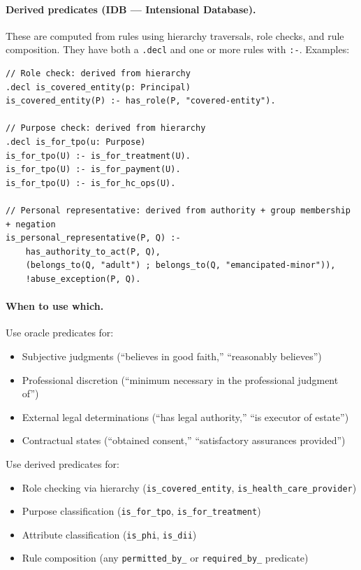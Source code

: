 \documentclass[11pt,letterpaper]{article}
\begin{document}
\paragraph{Derived predicates (IDB --- Intensional Database).} These are computed from rules using hierarchy traversals, role checks, and rule composition. They have both a \texttt{.decl} and one or more rules with \texttt{:-}. Examples:

\begin{lstlisting}[style=soufflestyle,caption={Derived predicates (from hipaa\_macros.dl)}]
// Role check: derived from hierarchy
.decl is_covered_entity(p: Principal)
is_covered_entity(P) :- has_role(P, "covered-entity").

// Purpose check: derived from hierarchy
.decl is_for_tpo(u: Purpose)
is_for_tpo(U) :- is_for_treatment(U).
is_for_tpo(U) :- is_for_payment(U).
is_for_tpo(U) :- is_for_hc_ops(U).

// Personal representative: derived from authority + group membership + negation
is_personal_representative(P, Q) :-
    has_authority_to_act(P, Q),
    (belongs_to(Q, "adult") ; belongs_to(Q, "emancipated-minor")),
    !abuse_exception(P, Q).
\end{lstlisting}

\paragraph{When to use which.} Use oracle predicates for:
\begin{itemize}
  \item Subjective judgments (``believes in good faith,'' ``reasonably believes'')
  \item Professional discretion (``minimum necessary in the professional judgment of'')
  \item External legal determinations (``has legal authority,'' ``is executor of estate'')
  \item Contractual states (``obtained consent,'' ``satisfactory assurances provided'')
\end{itemize}
Use derived predicates for:
\begin{itemize}
  \item Role checking via hierarchy (\texttt{is\_covered\_entity}, \texttt{is\_health\_care\_provider})
  \item Purpose classification (\texttt{is\_for\_tpo}, \texttt{is\_for\_treatment})
  \item Attribute classification (\texttt{is\_phi}, \texttt{is\_dii})
  \item Rule composition (any \texttt{permitted\_by\_} or \texttt{required\_by\_} predicate)
\end{itemize}
\end{document}
